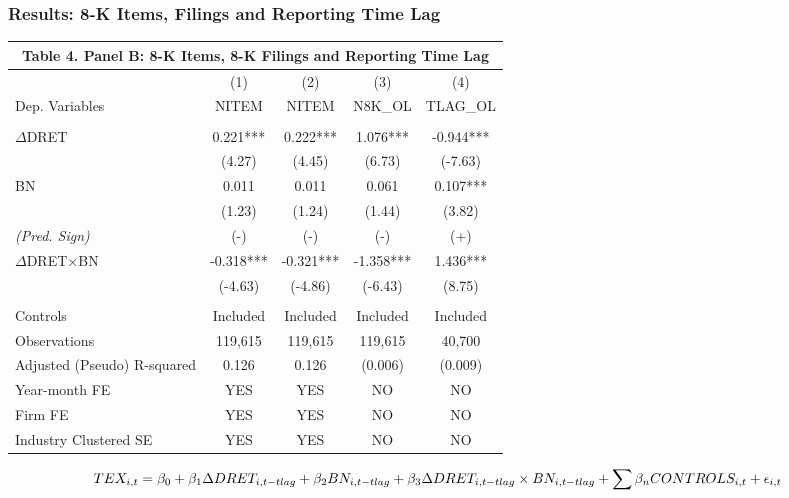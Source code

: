 \documentclass{beamer}
\begin{document}
\begin{frame}
\frametitle{Results: 8-K Items, Filings and Reporting Time Lag}
\begin{table}[H] \label{T4PB}%
	\begin{center}
	\scriptsize	
		\begin{tabular}{lcccc}
			\multicolumn{5}{c}{\textbf{Table 4. Panel B: 8-K Items, 8-K Filings and Reporting Time Lag}} \\
			\midrule
			\midrule
			& (1) & (2) & (3) & (4) \\
			Dep. Variables & NITEM & NITEM & N8K\_OL & TLAG\_OL \\
			\midrule
			&   &   &   &  \\
			$\Delta$DRET & 0.221*** & 0.222*** & 1.076*** & -0.944*** \\
			& (4.27) & (4.45) & (6.73) & (-7.63) \\
			BN & 0.011 & 0.011 & 0.061 & 0.107*** \\
			& (1.23) & (1.24) & (1.44) & (3.82) \\
			\textit{(Pred. Sign)} & (-) & (-) & (-) & (+) \\
			 $\Delta$DRET$\times$BN & -0.318*** & -0.321*** & -1.358*** & 1.436*** \\
			 & (-4.63) & (-4.86) & (-6.43) & (8.75) \\

			&   &   &   &  \\
			Controls & Included & Included & Included & Included \\
			Observations & 119,615 & 119,615 & 119,615 & 40,700 \\
			Adjusted (Pseudo) R-squared & 0.126 & 0.126  & (0.006) & (0.009) \\
			Year-month FE & YES & YES & NO & NO \\
			Firm FE & YES & YES & NO & NO \\
			Industry Clustered SE & YES & YES & NO & NO \\
			\bottomrule
			\bottomrule
		\end{tabular}%
	\end{center}
	\begin{footnotesize}
			
		\setcounter{equation}{1}
		\begin{equation} \tiny	
		TEX_{i,t}=\beta_0+\beta_1\Delta DRET_{i,t-tlag}+\beta_2BN_{i,t-tlag}+\beta_3\Delta DRET_{i,t-tlag}\times 	BN_{i,t-tlag}+\sum\beta_nCONTROLS_{i,t}+\epsilon_{i,t}
		\end{equation}

	\end{footnotesize}
\end{table}

\end{frame}
\end{document}
